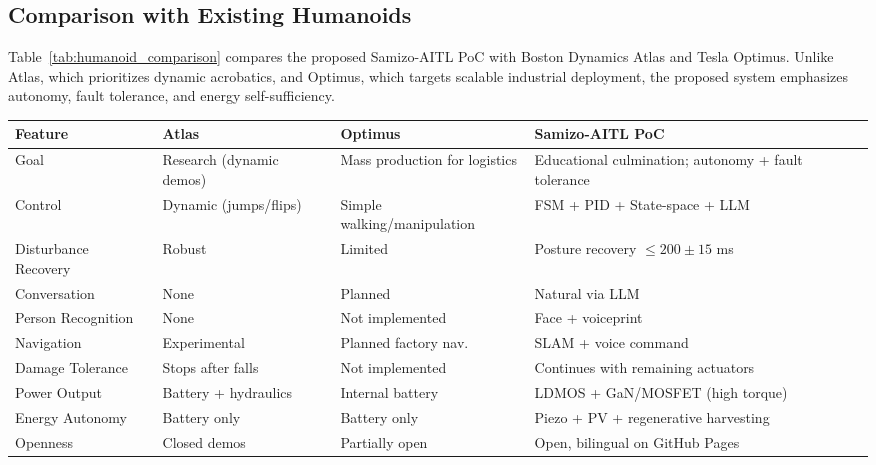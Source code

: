 \subsection{Comparison with Existing Humanoids}
Table~\ref{tab:humanoid_comparison} compares the proposed Samizo-AITL PoC 
with Boston Dynamics Atlas and Tesla Optimus.
Unlike Atlas, which prioritizes dynamic acrobatics,
and Optimus, which targets scalable industrial deployment,
the proposed system emphasizes autonomy, fault tolerance,
and energy self-sufficiency.

\begin{table*}[t]
\caption{Comparison of world-leading humanoid robots. 
Atlas excels in dynamic acrobatics, Optimus prioritizes scalable industrial deployment, 
and the proposed Samizo-AITL PoC emphasizes autonomy, fault tolerance, and sustainable energy use.}
\label{tab:humanoid_comparison}
\centering
\renewcommand{\arraystretch}{1.2}
\footnotesize
\begin{tabular}{p{2.5cm} p{2.5cm} p{2.5cm} p{6.5cm}}
\toprule
\textbf{Feature} & \textbf{Atlas} & \textbf{Optimus} & \textbf{Samizo-AITL PoC} \\
\midrule
Goal & Research (dynamic demos) & Mass production for logistics & Educational culmination; autonomy + fault tolerance \\
Control & Dynamic (jumps/flips) & Simple walking/manipulation & FSM + PID + State-space + LLM \\
Disturbance Recovery & Robust & Limited & Posture recovery $\leq 200 \pm 15$ ms \\
Conversation & None & Planned & Natural via LLM \\
Person Recognition & None & Not implemented & Face + voiceprint \\
Navigation & Experimental & Planned factory nav. & SLAM + voice command \\
Damage Tolerance & Stops after falls & Not implemented & Continues with remaining actuators \\
Power Output & Battery + hydraulics & Internal battery & LDMOS + GaN/MOSFET (high torque) \\
Energy Autonomy & Battery only & Battery only & Piezo + PV + regenerative harvesting \\
Openness & Closed demos & Partially open & Open, bilingual on GitHub Pages \\
\bottomrule
\end{tabular}
\end{table*}
